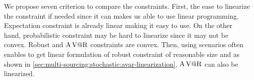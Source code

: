 


We propose seven criterion to compare the constraints.
First, the ease to linearize the constraint if needed since it can makes us able to use linear programming.
Expectation constraint is already linear making it easy to use.
On the other hand, probabilistic constraint may be hard to linearize since it may not be convex.
Robust and $\operatorname{A\operatorname{V@R}}$ constraints are convex.
Then, using scenarios often enables to get linear formulation of robust constraint of reasonable size and as shown in \cref{sec:multi-sourcing:stochastic:avar-linearization}, $\operatorname{A\operatorname{V@R}}$ can also be linearized.



